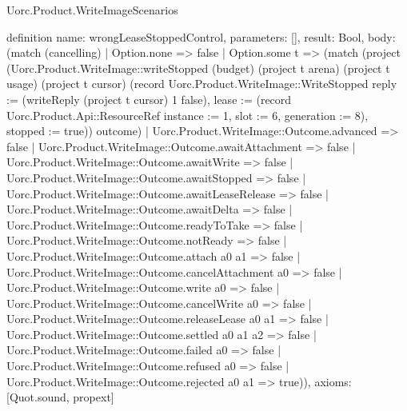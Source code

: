 \begin{lexlean}{Uorc.Product.WriteImageScenarios}
\begin{semanticmodule}
definition{
  name: wrongLeaseStoppedControl,
  parameters: [],
  result: Bool,
  body: (match (cancelling)
    | Option.none => false
    | Option.some t => (match (project (Uorc.Product.WriteImage::writeStopped (budget) (project t arena) (project t usage) (project t cursor) (record Uorc.Product.WriteImage::WriteStopped {reply := (writeReply (project t cursor) 1 false), lease := (record Uorc.Product.Api::ResourceRef {instance := 1, slot := 6, generation := 8}), stopped := true})) outcome)
      | Uorc.Product.WriteImage::Outcome.advanced => false
      | Uorc.Product.WriteImage::Outcome.awaitAttachment => false
      | Uorc.Product.WriteImage::Outcome.awaitWrite => false
      | Uorc.Product.WriteImage::Outcome.awaitStopped => false
      | Uorc.Product.WriteImage::Outcome.awaitLeaseRelease => false
      | Uorc.Product.WriteImage::Outcome.awaitDelta => false
      | Uorc.Product.WriteImage::Outcome.readyToTake => false
      | Uorc.Product.WriteImage::Outcome.notReady => false
      | Uorc.Product.WriteImage::Outcome.attach a0 a1 => false
      | Uorc.Product.WriteImage::Outcome.cancelAttachment a0 => false
      | Uorc.Product.WriteImage::Outcome.write a0 => false
      | Uorc.Product.WriteImage::Outcome.cancelWrite a0 => false
      | Uorc.Product.WriteImage::Outcome.releaseLease a0 a1 => false
      | Uorc.Product.WriteImage::Outcome.settled a0 a1 a2 => false
      | Uorc.Product.WriteImage::Outcome.failed a0 => false
      | Uorc.Product.WriteImage::Outcome.refused a0 => false
      | Uorc.Product.WriteImage::Outcome.rejected a0 a1 => true)),
  axioms: [Quot.sound, propext]
}


\end{semanticmodule}
\end{lexlean}
